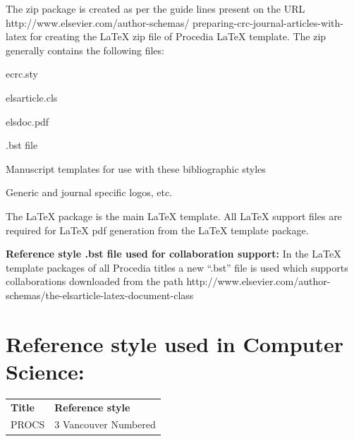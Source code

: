 \documentclass[3p,times,procedia]{elsarticle}
\begin{document}
The zip package is created as per the guide lines present on the URL http://www.elsevier.com/author-schemas/ preparing-crc-journal-articles-with-latex for creating the LaTeX zip file of Procedia LaTeX template.  The zip generally contains the following files:
\begin{Itemize}[]\leftskip-17.7pt
\item ecrc.sty
\item  elsarticle.cls
\item elsdoc.pdf
\item .bst file
\item Manuscript templates for use with these bibliographic styles
\item  Generic and journal specific logos, etc.
\end{Itemize}

The LaTeX package is the main LaTeX template. All LaTeX support files are required for LaTeX pdf generation from the LaTeX template package. 

{\bf Reference style .bst file used for collaboration support:} In the LaTeX template packages of all Procedia titles a new ``.bst'' file is used which supports collaborations downloaded from the path http://www.elsevier.com/author-schemas/the-elsarticle-latex-document-class

\section{Reference style used in Computer Science:}
\let\footnotesize\normalsize
\hspace*{-10pt}\begin{tabular*}{\hsize}{@{}ll@{}}
{\bf Title}&{\bf Reference style} \\[6pt]
PROCS  & 3 Vancouver Numbered
\end{tabular*}
\end{document}
